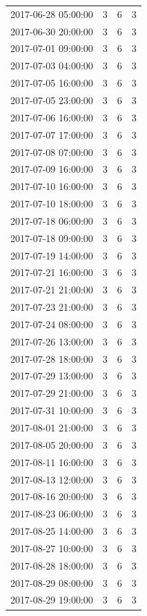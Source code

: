 \begin{tabular}{lrrr}
2017-06-28 05:00:00 & 3 & 6 & 3 \\
2017-06-30 20:00:00 & 3 & 6 & 3 \\
2017-07-01 09:00:00 & 3 & 6 & 3 \\
2017-07-03 04:00:00 & 3 & 6 & 3 \\
2017-07-05 16:00:00 & 3 & 6 & 3 \\
2017-07-05 23:00:00 & 3 & 6 & 3 \\
2017-07-06 16:00:00 & 3 & 6 & 3 \\
2017-07-07 17:00:00 & 3 & 6 & 3 \\
2017-07-08 07:00:00 & 3 & 6 & 3 \\
2017-07-09 16:00:00 & 3 & 6 & 3 \\
2017-07-10 16:00:00 & 3 & 6 & 3 \\
2017-07-10 18:00:00 & 3 & 6 & 3 \\
2017-07-18 06:00:00 & 3 & 6 & 3 \\
2017-07-18 09:00:00 & 3 & 6 & 3 \\
2017-07-19 14:00:00 & 3 & 6 & 3 \\
2017-07-21 16:00:00 & 3 & 6 & 3 \\
2017-07-21 21:00:00 & 3 & 6 & 3 \\
2017-07-23 21:00:00 & 3 & 6 & 3 \\
2017-07-24 08:00:00 & 3 & 6 & 3 \\
2017-07-26 13:00:00 & 3 & 6 & 3 \\
2017-07-28 18:00:00 & 3 & 6 & 3 \\
2017-07-29 13:00:00 & 3 & 6 & 3 \\
2017-07-29 21:00:00 & 3 & 6 & 3 \\
2017-07-31 10:00:00 & 3 & 6 & 3 \\
2017-08-01 21:00:00 & 3 & 6 & 3 \\
2017-08-05 20:00:00 & 3 & 6 & 3 \\
2017-08-11 16:00:00 & 3 & 6 & 3 \\
2017-08-13 12:00:00 & 3 & 6 & 3 \\
2017-08-16 20:00:00 & 3 & 6 & 3 \\
2017-08-23 06:00:00 & 3 & 6 & 3 \\
2017-08-25 14:00:00 & 3 & 6 & 3 \\
2017-08-27 10:00:00 & 3 & 6 & 3 \\
2017-08-28 18:00:00 & 3 & 6 & 3 \\
2017-08-29 08:00:00 & 3 & 6 & 3 \\
2017-08-29 19:00:00 & 3 & 6 & 3 \\

\end{tabular}
